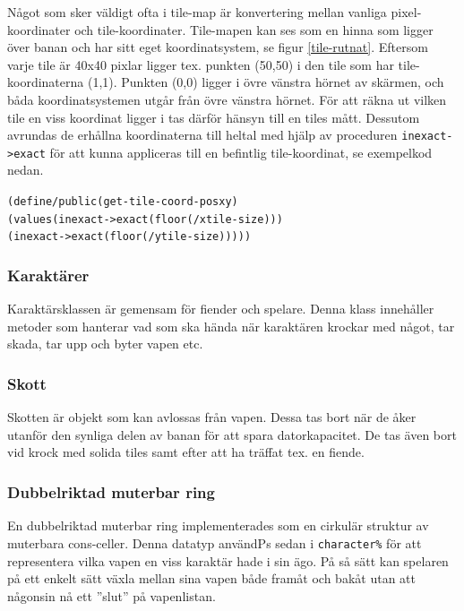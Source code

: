 \documentclass{scrartcl}
\newcommand{\code}[1]%
{\texttt{#1}}
\begin{document}
Något som sker väldigt ofta i tile-map är konvertering mellan vanliga pixel-koordinater och tile-koordinater. Tile-mapen kan ses som en hinna som ligger över banan och har sitt eget koordinatsystem, se figur \ref{tile-rutnat}. Eftersom varje tile är 40x40 pixlar ligger tex. punkten (50,50) i den tile som har tile-koordinaterna (1,1). Punkten (0,0) ligger i övre vänstra hörnet av skärmen, och båda koordinatsystemen utgår från övre vänstra hörnet. För att räkna ut vilken tile en viss koordinat ligger i tas därför hänsyn till en tiles mått. Dessutom avrundas de erhållna koordinaterna till heltal med hjälp av proceduren \code{inexact->exact} för att kunna appliceras till en befintlig tile-koordinat, se exempelkod nedan. 
\begin{alltt}
(define/public (get-tile-coord-pos x y) 
      (values (inexact->exact (floor (/ x tile-size)))
              (inexact->exact (floor (/ y tile-size)))))
\end{alltt}         


\subsubsection{Karaktärer}

Karaktärsklassen är gemensam för fiender och spelare. Denna klass innehåller metoder som hanterar vad som ska hända när karaktären krockar med något, tar skada, tar upp och byter vapen etc.  

\subsubsection{Skott}

Skotten är objekt som kan avlossas från vapen. Dessa tas bort när de åker utanför den synliga delen av banan för att spara datorkapacitet. De tas även bort vid krock med solida tiles samt efter att ha träffat tex. en fiende. 

\subsubsection{Dubbelriktad muterbar ring}

En dubbelriktad muterbar ring implementerades som en cirkulär struktur av muterbara cons-celler. Denna datatyp användPs sedan i \code{character\%} för att representera vilka vapen en viss karaktär hade i sin ägo. På så sätt kan spelaren på ett enkelt sätt växla mellan sina vapen både framåt och bakåt utan att någonsin nå ett ''slut'' på vapenlistan.
\end{document}
